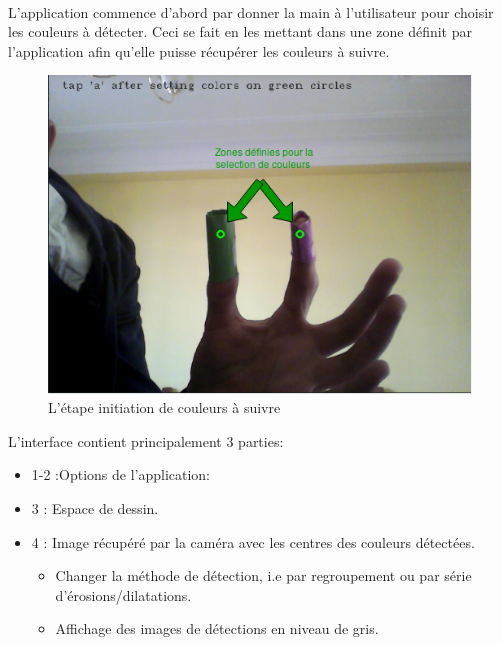 \documentclass[12pt]{report}
\begin{document}
	\paragraph{}
	L’application commence d’abord par donner la main à l’utilisateur pour choisir les couleurs à détecter. Ceci se fait en les mettant dans une zone définit par l’application afin qu’elle puisse récupérer les couleurs à suivre.\\
	\begin{figure}[H]
		\centering
		\includegraphics[scale=0.6]{imgs/initColors.png}
		\caption{L'étape initiation de couleurs à suivre}
		\label{fig:InitColors}
	\end{figure}
	\newpage
	L’interface contient principalement 3 parties:
	\begin{itemize}
		\item 1-2 :Options de l’application:
		\item 3 : Espace de dessin.
		\item 4 : Image récupéré par la caméra avec les centres des couleurs détectées.
		\begin{itemize}
			\item Changer la méthode de détection, i.e par regroupement ou par série d’érosions/dilatations.
			\item Affichage des images de détections en niveau de gris.
		\end{itemize}
	\end{itemize}
\end{document}
